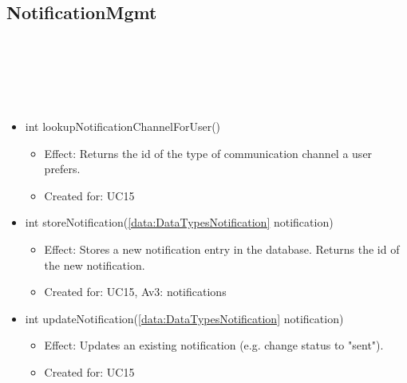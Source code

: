   \subsection{NotificationMgmt}\label{int:DatabaseDatabaseNotificationMgmt}
    \begin{description}
      \item[Provided by:] \iconcomponent{}~
      \item[Required by:] \iconcomponent{}~
      \item[Operations:] ~
    \begin{itemize}[noitemsep,nolistsep,leftmargin=-.25cm]
      \item \textsf{int lookupNotificationChannelForUser()}
        \begin{itemize}[noitemsep,nolistsep]
           \item Effect: Returns the id of the type of communication channel a user prefers.
\item Created for: UC15
        \end{itemize}
      \item \textsf{int storeNotification(\ref{data:DataTypesNotification} notification)}
        \begin{itemize}[noitemsep,nolistsep]
           \item Effect: Stores a new notification entry in the database. Returns the id of the new notification. \\
\item Created for: UC15, Av3: notifications
        \end{itemize}
      \item \textsf{int updateNotification(\ref{data:DataTypesNotification} notification)}
        \begin{itemize}[noitemsep,nolistsep]
           \item Effect: Updates an existing notification (e.g. change status to "sent").
\item Created for: UC15
        \end{itemize}
    \end{itemize}
    \end{description}

